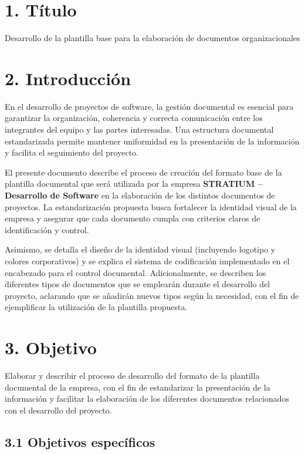 \documentclass{encabezado}
\begin{document}
\section*{1. Título}
Desarrollo de la plantilla base para la elaboración de documentos organizacionales

\section*{2. Introducción}

En el desarrollo de proyectos de software, la gestión documental es esencial para garantizar la organización, coherencia y correcta comunicación entre los integrantes del equipo y las partes interesadas. Una estructura documental estandarizada permite mantener uniformidad en la presentación de la información y facilita el seguimiento del proyecto.

El presente documento describe el proceso de creación del formato base de la plantilla documental que será utilizada por la empresa \textbf{STRATIUM -- Desarrollo de Software} en la elaboración de los distintos documentos de proyectos. La estandarización propuesta busca fortalecer la identidad visual de la empresa y asegurar que cada documento cumpla con criterios claros de identificación y control.

Asimismo, se detalla el diseño de la identidad visual (incluyendo logotipo y colores corporativos) y se explica el sistema de codificación implementado en el encabezado para el control documental. Adicionalmente, se describen los diferentes tipos de documentos que se emplearán durante el desarrollo del proyecto, aclarando que se añadirán nuevos tipos según la necesidad, con el fin de ejemplificar la utilización de la plantilla propuesta.

\section*{3. Objetivo}

Elaborar y describir el proceso de desarrollo del formato de la plantilla documental de la empresa, con el fin de estandarizar la presentación de la información y facilitar la elaboración de los diferentes documentos relacionados con el desarrollo del proyecto.

\subsection*{3.1 Objetivos específicos}
\end{document}
